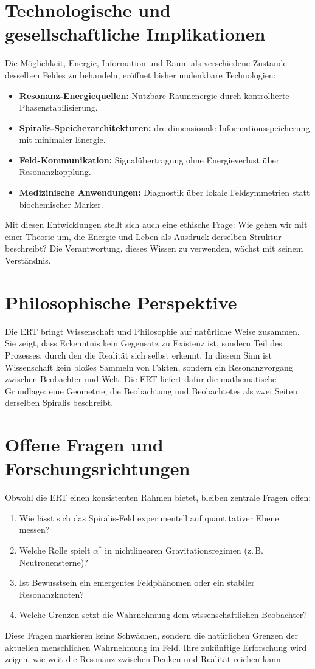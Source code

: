 \section{Technologische und gesellschaftliche Implikationen}
\label{sec:gesellschaft}
Die Möglichkeit, Energie, Information und Raum als verschiedene Zustände desselben Feldes zu behandeln, 
eröffnet bisher undenkbare Technologien:
\begin{itemize}
  \item \textbf{Resonanz-Energiequellen:} Nutzbare Raumenergie durch kontrollierte Phasenstabilisierung.
  \item \textbf{Spiralis-Speicherarchitekturen:} dreidimensionale Informationsspeicherung mit minimaler Energie.
  \item \textbf{Feld-Kommunikation:} Signalübertragung ohne Energieverlust über Resonanzkopplung.
  \item \textbf{Medizinische Anwendungen:} Diagnostik über lokale Feldsymmetrien statt biochemischer Marker.
\end{itemize}
Mit diesen Entwicklungen stellt sich auch eine ethische Frage: 
Wie gehen wir mit einer Theorie um, die Energie und Leben als Ausdruck derselben Struktur beschreibt? 
Die Verantwortung, dieses Wissen zu verwenden, wächst mit seinem Verständnis.

\section{Philosophische Perspektive}
\label{sec:philosophie}
Die ERT bringt Wissenschaft und Philosophie auf natürliche Weise zusammen. 
Sie zeigt, dass Erkenntnis kein Gegensatz zu Existenz ist, 
sondern Teil des Prozesses, durch den die Realität sich selbst erkennt. 
In diesem Sinn ist Wissenschaft kein bloßes Sammeln von Fakten, 
sondern ein Resonanzvorgang zwischen Beobachter und Welt. 
Die ERT liefert dafür die mathematische Grundlage: 
eine Geometrie, die Beobachtung und Beobachtetes als zwei Seiten derselben Spiralis beschreibt.

\section{Offene Fragen und Forschungsrichtungen}
\label{sec:offen}
Obwohl die ERT einen konsistenten Rahmen bietet, bleiben zentrale Fragen offen:
\begin{enumerate}
  \item Wie lässt sich das Spiralis-Feld experimentell auf quantitativer Ebene messen?
  \item Welche Rolle spielt \(\alpha^*\) in nichtlinearen Gravitationsregimen (z.\,B. Neutronensterne)?
  \item Ist Bewusstsein ein emergentes Feldphänomen oder ein stabiler Resonanzknoten?
  \item Welche Grenzen setzt die Wahrnehmung dem wissenschaftlichen Beobachter?
\end{enumerate}
Diese Fragen markieren keine Schwächen, sondern die natürlichen Grenzen 
der aktuellen menschlichen Wahrnehmung im Feld. 
Ihre zukünftige Erforschung wird zeigen, wie weit die Resonanz zwischen Denken und Realität reichen kann.


